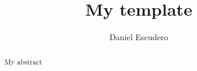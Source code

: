 \documentclass[
draft=false,
fontsize=10pt,
titlepage=false,
abstract=true, %
parskip=half, %
footnotes=multiple, %
%
DIV=10, %
twoside=false,
twocolumn=false,
headinclude=false,
footinclude=false, %
headsepline=fale,
footsepline=false, %
%
]{scrartcl} %
\title{My template}
\author{Daniel Escudero}
\date{}
\begin{document}
 
\maketitle 

\begin{abstract}
  My abstract
\end{abstract}

\Blinddocument
\end{document}
